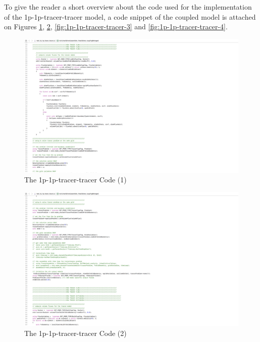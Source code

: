 To give the reader a short overview about the code used for the implementation of the 1p-1p-tracer-tracer model, a code snippet of the coupled model is attached on Figures \ref{fig:1p-1p-tracer-tracer-1}, \ref{fig:1p-1p-tracer-tracer-2}, \ref{fig:1p-1p-tracer-tracer-3} and \ref{fig:1p-1p-tracer-tracer-4}.
\begin{figure}[h]
\centering
\includegraphics[width=350mm]{1p_1p_tracer_tracer_1}
\caption{\footnotesize The 1p-1p-tracer-tracer Code (1)}
\label{fig:1p-1p-tracer-tracer-1}
\end{figure}
\begin{figure}[h]
\centering
\includegraphics[width=350mm]{1p_1p_tracer_tracer_2}
\caption{\footnotesize The 1p-1p-tracer-tracer Code (2)}
\label{fig:1p-1p-tracer-tracer-2}
\end{figure}
